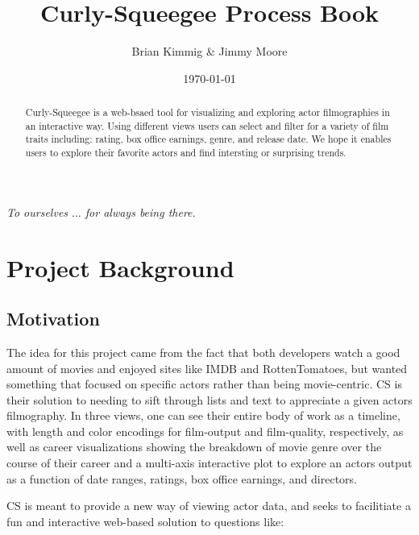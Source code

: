 \documentclass[12pt]{article}
\title{Curly-Squeegee Process Book}
\author{ Brian Kimmig \& Jimmy Moore}
\date{\today}
\begin{document}
\maketitle

\begin{abstract}
	Curly-Squeegee is a web-bsaed tool for visualizing and exploring actor filmographies in an interactive way. Using different views users can select and filter for a variety of film traits including: rating, box office earnings, genre, and release date.  We hope it enables users to explore their favorite actors and find intersting or surprising trends.
\end{abstract}

\newpage

\tableofcontents

\newpage


\begin{center}

	\vspace*{\fill}
	\textit{To ourselves $\dots$ for always being there.}
	\vspace*{\fill}
	
\end{center}

\newpage 


\section{Project Background}

\subsection{Motivation}\label{sec:Motivation}
	The idea for this project came from the fact that both developers watch a good amount of movies and enjoyed sites like IMDB and RottenTomatoes, but wanted something that focused on specific actors rather than being movie-centric. CS is their solution to needing to sift through lists and text to appreciate a given actors filmography. In three views, one can see their entire body of work as a timeline, with length and color encodings for film-output and film-quality, respectively, as well as career visualizations showing the breakdown of movie genre over the course of their career and a multi-axis interactive plot to explore an actors output as a function of date ranges, ratings, box office earnings, and directors.
	
	CS is meant to provide a new way of viewing actor data, and seeks to facilitiate a fun and interactive web-based solution to questions like:
\end{document}
